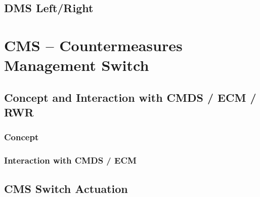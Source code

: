 \documentclass[11pt, a4paper, twoside]{report}
\begin{document}
\section{DMS Left/Right}
\label{sec:C4-S4}

\chapter{CMS -- Countermeasures Management Switch}
\label{chap:C5}

\section{Concept and Interaction with CMDS / ECM / RWR}\label{sec:C5-S1}

\subsection{Concept}
\label{sec:C5-S1-S1}

\subsection{Interaction with CMDS / ECM}
\label{sec:C5-S1-S2}

\section{CMS Switch Actuation}
\label{sec:C5-S2}
\end{document}
